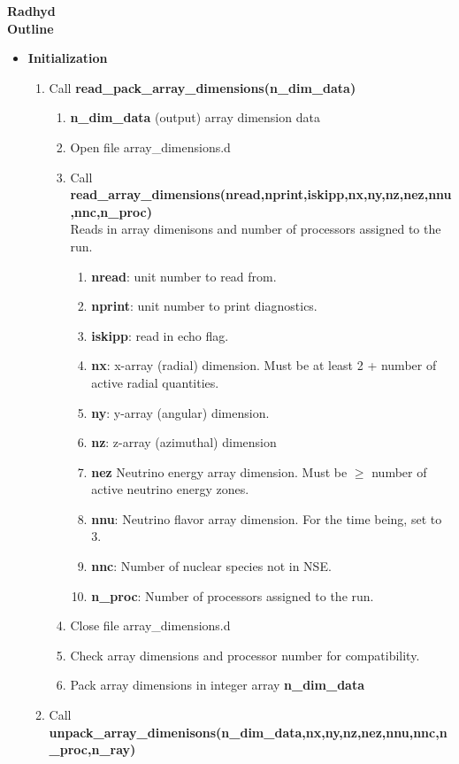 \documentclass[11pt,doublespace]{article}
\begin{document}
\begin{center}
{\large {\bf Radhyd\\
Outline}}
\end{center}

\begin{itemize}
  \item {\bf Initialization}
\begin{enumerate}
  \item Call {\bf read\_pack\_array\_dimensions(n\_dim\_data)}
\begin{enumerate}
  \item {\bf n\_dim\_data} (output) array dimension data
  \item Open file array\_dimensions.d
  \item Call {\bf read\_array\_dimensions(nread,nprint,iskipp,nx,ny,nz,nez,nnu,nnc,n\_proc)}\\
  Reads in array dimenisons and number of processors assigned to the run.
\begin{enumerate}
  \item {\bf nread}: unit number to read from.
  \item {\bf nprint}: unit number to print diagnostics.
  \item {\bf iskipp}: read in echo flag.
  \item {\bf nx}: x-array (radial) dimension. Must be at least 2 + number of active radial quantities.
  \item {\bf ny}: y-array (angular) dimension.
  \item {\bf nz}: z-array (azimuthal) dimension
  \item  {\bf nez} Neutrino energy array dimension. Must be $\ge$ number of active neutrino energy zones.
  \item  {\bf nnu}: Neutrino flavor array dimension. For the time being, set to 3.
  \item  {\bf nnc}: Number of nuclear species not in NSE.
  \item  {\bf n\_proc}: Number of processors assigned to the run.
\end{enumerate}
  \item Close file array\_dimensions.d
  \item Check array dimensions and processor number for compatibility.
  \item Pack array dimensions in integer array {\bf n\_dim\_data}
\end{enumerate}
  \item Call {\bf unpack\_array\_dimenisons(n\_dim\_data,nx,ny,nz,nez,nnu,nnc,n\_proc,n\_ray)}\\

\end{enumerate}
\end{itemize}
\end{document}
